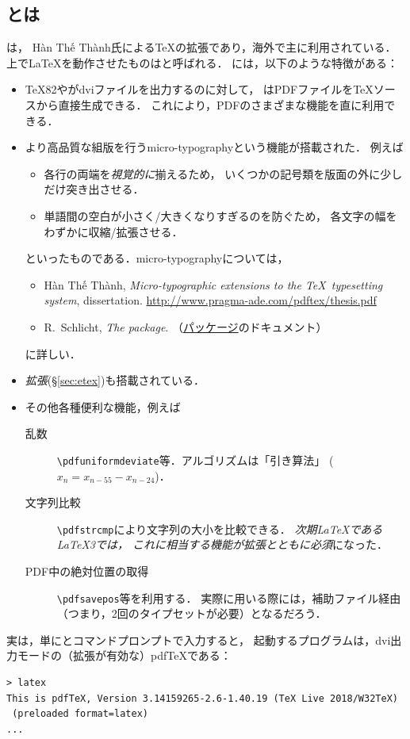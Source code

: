 \documentclass[b5paper]{bxjsarticle} %
\begin{document}
\subsection{\pdfTeX とは}
\href{http://www.tug.org/applications/pdftex/}{\emph{\pdfTeX}}\>は，
Hàn Thế Thành氏による\TeX の拡張であり，海外で主に利用されている．
\pdfTeX 上で\LaTeX を動作させたものは\pdfLaTeX と呼ばれる．
\pdfTeX には，以下のような特徴がある：
\begin{itemize}
\item \TeX82や\pTeX がdviファイルを出力するのに対して，
  \pdfTeX はPDFファイルを\TeX ソースから直接生成できる．
  これにより，PDFのさまざまな機能を直に利用できる．
\item より高品質な組版を行うmicro-typographyという機能が搭載された．
  例えば
\begin{itemize}
\item 各行の両端を\emph{視覚的に}揃えるため，
  いくつかの記号類を版面の外に少しだけ突き出させる．
\item 単語間の空白が小さく/大きくなりすぎるのを防ぐため，
  各文字の幅をわずかに収縮/拡張させる．
\end{itemize}
といったものである．micro-typographyについては，
\begin{itemize}
\item Hàn Thế Thành, \textit{Micro-typographic extensions
  to the \TeX\ typesetting system}, dissertation.
  \url{http://www.pragma-ade.com/pdftex/thesis.pdf}
\item R.~Schlicht, \textit{The  package}.
（\href{https://ctan.org/pkg/microtype}{パッケージ}のドキュメント）
\end{itemize}
に詳しい．
\item \emph{\eTeX 拡張}\>(\S\ref{sec:etex})も搭載されている．
\item その他各種便利な機能，例えば
\begin{description}
 \item[乱数] \verb+\pdfuniformdeviate+等．アルゴリズムは「引き算法」%
($x_n=x_{n-55}-x_{n-24}$)．
 \item[文字列比較] \verb+\pdfstrcmp+により文字列の大小を比較できる．
\emph{次期\LaTeX である\LaTeX3では，
これに相当する機能が\eTeX 拡張とともに必須}になった．
\item[PDF中の絶対位置の取得] \verb+\pdfsavepos+等を利用する．
実際に用いる際には，補助ファイル経由（つまり，2回のタイプセットが必要）となるだろう．
\end{description}
\end{itemize}
実は，単にとコマンドプロンプトで入力すると，
起動するプログラムは，dvi出力モードの（\eTeX 拡張が有効な）pdf\TeX である：
\begin{lstlisting}
> latex
This is pdfTeX, Version 3.14159265-2.6-1.40.19 (TeX Live 2018/W32TeX)
 (preloaded format=latex)
...
\end{lstlisting}
\end{document}

